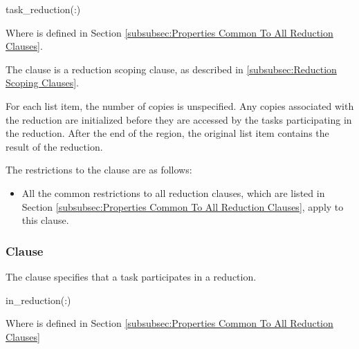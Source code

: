 \syntax
\begin{ompSyntax}
task_reduction(:)
\end{ompSyntax}
Where  is defined in Section
\ref{subsubsec:Properties Common To All Reduction Clauses}.

\descr
The  clause is a reduction scoping clause, as described in
\ref{subsubsec:Reduction Scoping Clauses}.

For each list item, the number of copies is unspecified. Any copies associated
with the reduction are initialized before they are accessed by the tasks
participating in the reduction. After the end of the region, the original list
item contains the result of the reduction.

\restrictions
The restrictions to the  clause are as follows:

\begin{itemize}
\item All the common restrictions to all reduction clauses, which are listed in
Section \ref{subsubsec:Properties Common To All Reduction Clauses}, apply to
this clause.
\end{itemize}












\subsubsection{ Clause}
\label{subsubsec:in_reduction clause}
\summary
The  clause specifies that a task participates in a reduction.

\syntax
\begin{ompSyntax}
in_reduction(:)
\end{ompSyntax}
Where  is defined in Section \ref{subsubsec:Properties Common To All Reduction Clauses}

\descr

